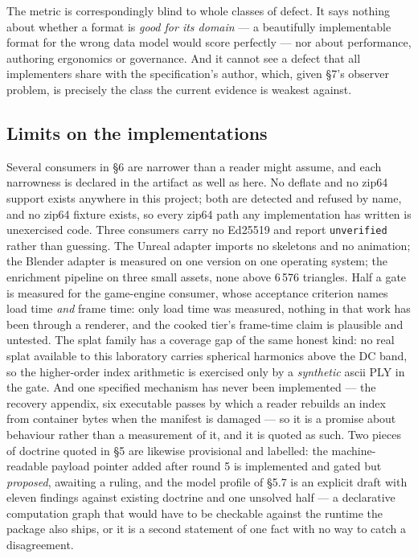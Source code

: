 \documentclass[10pt,twocolumn,letterpaper]{article}
\newcommand{\code}[1]{\texttt{\small #1}}
\begin{document}
The metric is correspondingly blind to whole classes of defect. It says nothing about whether a format is \emph{good for its domain} --- a beautifully implementable format for the wrong data model would score perfectly --- nor about performance, authoring ergonomics or governance. And it cannot see a defect that all implementers share with the specification's author, which, given \S7's observer problem, is precisely the class the current evidence is weakest against.

\subsection{Limits on the implementations}

Several consumers in \S6 are narrower than a reader might assume, and each narrowness is declared in the artifact as well as here. No deflate and no zip64 support exists anywhere in this project; both are detected and refused by name, and no zip64 fixture exists, so every zip64 path any implementation has written is unexercised code. Three consumers carry no Ed25519 and report \code{unverified} rather than guessing. The Unreal adapter imports no skeletons and no animation; the Blender adapter is measured on one version on one operating system; the enrichment pipeline on three small assets, none above 6\,576 triangles. Half a gate is measured for the game-engine consumer, whose acceptance criterion names load time \emph{and} frame time: only load time was measured, nothing in that work has been through a renderer, and the cooked tier's frame-time claim is plausible and untested. The splat family has a coverage gap of the same honest kind: no real splat available to this laboratory carries spherical harmonics above the DC band, so the higher-order index arithmetic is exercised only by a \emph{synthetic} ascii PLY in the gate. And one specified mechanism has never been implemented --- the recovery appendix, six executable passes by which a reader rebuilds an index from container bytes when the manifest is damaged --- so it is a promise about behaviour rather than a measurement of it, and it is quoted as such. Two pieces of doctrine quoted in \S5 are likewise provisional and labelled: the machine-readable payload pointer added after round 5 is implemented and gated but \emph{proposed}, awaiting a ruling, and the model profile of \S5.7 is an explicit draft with eleven findings against existing doctrine and one unsolved half --- a declarative computation graph that would have to be checkable against the runtime the package also ships, or it is a second statement of one fact with no way to catch a disagreement.
\end{document}
